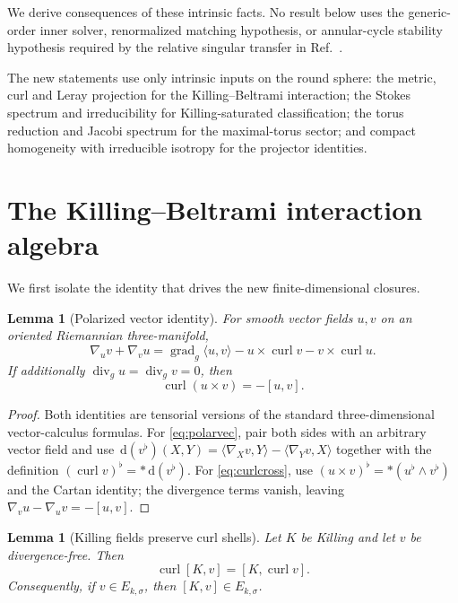 \documentclass[
 aps,
 prd,
 reprint,
 amsmath,
 amssymb,
 nofootinbib,
 superscriptaddress
]{revtex4-2}
\newtheorem{lemma}[theorem]{Lemma}
\theoremstyle{definition}
\theoremstyle{remark}
\newcommand{\curl}{\operatorname{curl}}
\newcommand{\divg}{\operatorname{div}_g}
\newcommand{\gradg}{\operatorname{grad}_g}
\newcommand{\dd}{\,\mathrm d}
\begin{document}
We derive consequences of these intrinsic facts.  No result
below uses the generic-order inner solver, renormalized matching hypothesis,
or annular-cycle stability hypothesis required by the relative singular
transfer in Ref.~\cite{PreeceBatenin2026}.


The new statements use only intrinsic inputs on the round sphere:
the metric, curl and Leray projection for the Killing--Beltrami interaction;
the Stokes spectrum and irreducibility for Killing-saturated classification;
the torus reduction and Jacobi spectrum for the maximal-torus sector; and
compact homogeneity with irreducible isotropy for the projector identities.





\section{The Killing--Beltrami interaction algebra}
\label{sec:KB}

We first isolate the identity that drives the new finite-dimensional
closures.

\begin{lemma}[Polarized vector identity]
For smooth vector fields $u,v$ on an oriented Riemannian three-manifold,
\begin{equation}
 \nabla_u v+\nabla_v u
 =
 \gradg\langle u,v\rangle
 -u\times\curl v-v\times\curl u.
 \label{eq:polarvec}
\end{equation}
If additionally $\divg u=\divg v=0$, then
\begin{equation}
 \curl(u\times v)=-[u,v].
 \label{eq:curlcross}
\end{equation}
\end{lemma}

\begin{proof}
Both identities are tensorial versions of the standard three-dimensional
vector-calculus formulas.  For \eqref{eq:polarvec}, pair both sides with an
arbitrary vector field and use
$\dd(v^\flat)(X,Y)=\langle\nabla_Xv,Y\rangle-
\langle\nabla_Yv,X\rangle$ together with the definition
$(\curl v)^\flat=*\dd(v^\flat)$.
For \eqref{eq:curlcross}, use
$(u\times v)^\flat=*(u^\flat\wedge v^\flat)$ and the Cartan identity;
the divergence terms vanish, leaving
$\nabla_vu-\nabla_uv=-[u,v]$.
\end{proof}

\begin{lemma}[Killing fields preserve curl shells]
Let $K$ be Killing and let $v$ be divergence-free.  Then
\begin{equation}
 \curl[K,v]=[K,\curl v].
 \label{eq:curlnatural}
\end{equation}
Consequently, if $v\in E_{k,\sigma}$, then
$[K,v]\in E_{k,\sigma}$.
\end{lemma}
\end{document}
